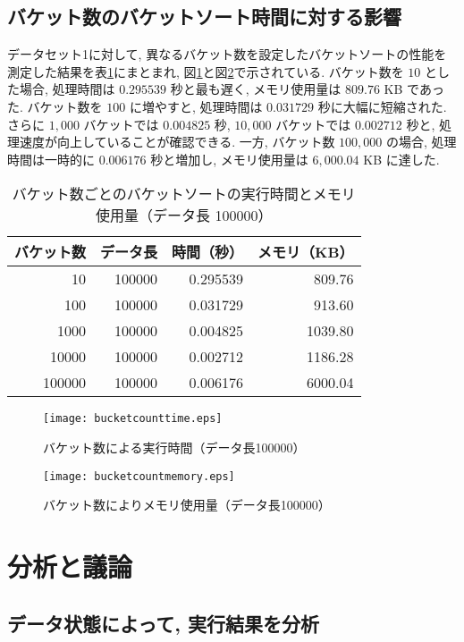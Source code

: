 \documentclass[a4j, 11pt]{jarticle}
\begin{document}
\subsection{バケット数のバケットソート時間に対する影響}
データセット1に対して, 異なるバケット数を設定したバケットソートの性能を測定した結果を表\ref{bucketcountresult}にまとまれ, 図\ref{bucketcounttimegraph}と図\ref{bucketcountmemorygraph}で示されている. バケット数を $10$ とした場合, 処理時間は $0.295539$ 秒と最も遅く, メモリ使用量は $809.76$ KB であった. バケット数を $100$ に増やすと, 処理時間は $0.031729$ 秒に大幅に短縮された. さらに $1,000$ バケットでは $0.004825$ 秒, $10,000$ バケットでは $0.002712$ 秒と, 処理速度が向上していることが確認できる. 一方, バケット数 $100,000$ の場合, 処理時間は一時的に $0.006176$ 秒と増加し, メモリ使用量は $6,000.04$ KB に達した. 
\begin{table}[H]
  \centering
  \caption{バケット数ごとのバケットソートの実行時間とメモリ使用量（データ長 100000）}\label{bucketcountresult}
  \begin{tabular}{|r|r|r|r|}
    \hline
    \textbf{バケット数} & \textbf{データ長} & \textbf{時間（秒）} & \textbf{メモリ（KB）} \\
    \hline
    10      & 100000 & 0.295539 & 809.76  \\
    100     & 100000 & 0.031729 & 913.60  \\
    1000    & 100000 & 0.004825 & 1039.80 \\
    10000   & 100000 & 0.002712 & 1186.28 \\
    100000  & 100000 & 0.006176 & 6000.04 \\
    \hline
  \end{tabular}
\end{table}
\begin{figure}[H]
  \centering
  \texttt{[image: bucketcounttime.eps]}
  \caption{バケット数による実行時間（データ長100000）}\label{bucketcounttimegraph}
\end{figure}
\begin{figure}[H]
  \centering
  \texttt{[image: bucketcountmemory.eps]}
  \caption{バケット数によりメモリ使用量（データ長100000）}\label{bucketcountmemorygraph}
\end{figure}
\section{分析と議論}
\subsection{データ状態によって, 実行結果を分析}
\end{document}
